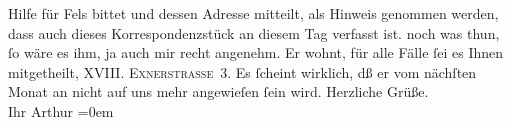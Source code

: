 \begin{ledgroupsized}[t]{13cm}
{{{                  Hilfe für Fels bittet und dessen Adresse
                  mitteilt, als Hinweis genommen werden, dass auch dieses Korrespondenzstück an
                  diesem Tag verfasst ist.}}}\label{K_L00324_1h} noch was thun, ſo wäre es ihm, ja auch mir recht
               angenehm. Er wohnt, für alle Fälle ſei es Ihnen mitgetheilt, \textsc{XVIII. Exnerstraße 3}. Es ſcheint wirklich, dß er vom nächſten Monat {\pb}an
               nicht auf uns mehr angewieſen ſein wird.\pend
           \pstart
           Herzliche Grüße.{\\[\baselineskip]}Ihr \spacefill\mbox{Arthur}\pend
           \leftskip=0em{}\endnumbering{}\end{ledgroupsized}  \newcommand{\dateiname}{L00324}\newcommand{\titel}{Arthur Schnitzler an Hugo von Hofmannsthal, [15. 5. 1894?]}\newcommand{\editorInnen}{Martin Anton Müller und Gerd-Hermann Susen}
      